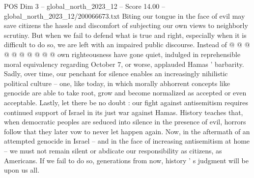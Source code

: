\begin{textsample}{POS Dim 3 – global\_north\_2023\_12 – Score 14.00 – global\_north\_2023\_12/200066673.txt}
Biting our tongue in the face of evil may save citizens the hassle and discomfort of subjecting our own views to neighborly scrutiny.
But when we fail to defend what is true and right, especially when it is difficult to do so, we are left with an impaired public discourse.
Instead of @ @ @ @ @ @ @ @ @ @ own righteousness have gone quiet, indulged in reprehensible moral equivalency regarding October 7, or worse, applauded Hamas ' barbarity.
Sadly, over time, our penchant for silence enables an increasingly nihilistic political culture -- one, like today, in which morally abhorrent concepts like genocide are able to take root, grow and become normalized as accepted or even acceptable.
Lastly, let there be no doubt : our fight against antisemitism requires continued support of Israel in its just war against Hamas.
History teaches that, when democratic peoples are seduced into silence in the presence of evil, horrors follow that they later vow to never let happen again.
Now, in the aftermath of an attempted genocide in Israel -- and in the face of increasing antisemitism at home -- we must not remain silent or abdicate our responsibility as citizens, as Americans.
If we fail to do so, generations from now, history ' s judgment will be upon us all.

\end{textsample}
